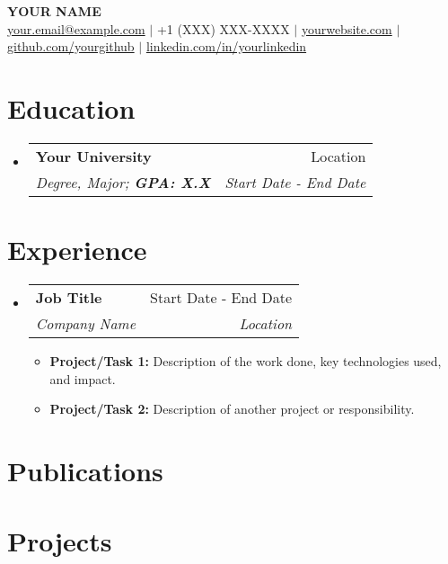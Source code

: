 \documentclass[a4paper,10pt]{article}
\makeatletter
\newcommand{\resumeItem}[2]{
  \item\small{
    \textbf{#1}{#2 \vspace{-2pt}}
  }
}
\newcommand{\resumeSubheading}[4]{
  \vspace{1.5pt}\item
    \begin{tabular*}{0.97\textwidth}{l@{\extracolsep{\fill}}r}
      \textbf{\small #1} & \small #2 \\
      \textit{\small #4} & \textit{\small #3} \\
    \end{tabular*}\vspace{-4pt}
}
\newcommand{\resumeSubHeadingListStart}{\begin{itemize}[leftmargin=*]}
\newcommand{\resumeSubHeadingListEnd}{\end{itemize}}
\newcommand{\resumeItemListStart}{\begin{itemize}[leftmargin=10pt]}
\newcommand{\resumeItemListEnd}{\end{itemize}\vspace{-5pt}}
\makeatother
\begin{document}
\justify
\begin{center}
  \textbf{\Large YOUR NAME} \\
  \vspace{2pt}
  \small 
  \href{mailto:your.email@example.com}{your.email@example.com} $|$ +1 (XXX) XXX-XXXX $|$
  \href{https://yourwebsite.com}{yourwebsite.com} $|$
  \href{https://github.com/yourgithub}{github.com/yourgithub} $|$
  \href{https://linkedin.com/in/yourlinkedin}{linkedin.com/in/yourlinkedin}
\end{center}

\vspace{-4pt}
\section{Education}
  \resumeSubHeadingListStart
    \resumeSubheading
      {Your University}{Location}
      {Start Date - End Date}{Degree, Major; \textbf{GPA: X.X}}
  \resumeSubHeadingListEnd

\vspace{-6pt}
\section{Experience}
\resumeSubHeadingListStart
    \resumeSubheading
      {Job Title}{Start Date - End Date}
      {Location}{Company Name}
      \resumeItemListStart
        \resumeItem{Project/Task 1: }
          {Description of the work done, key technologies used, and impact.}
        \resumeItem{Project/Task 2: }
          {Description of another project or responsibility.}
      \resumeItemListEnd
\resumeSubHeadingListEnd

  \vspace{0pt}
  \section{Publications}
  \resumeSubHeadingListStart
  \resumeSubHeadingListEnd

\vspace{0pt}
\section{Projects}
\resumeSubHeadingListStart
{}
\resumeSubHeadingListEnd
\end{document}
